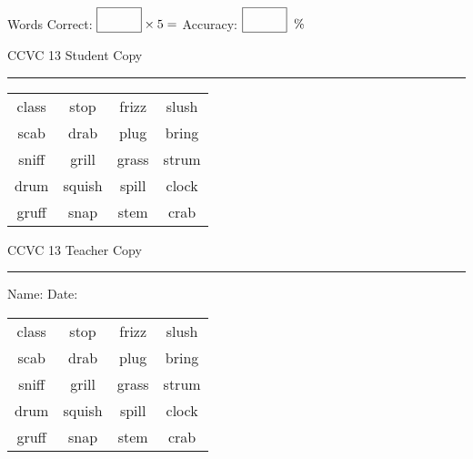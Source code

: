\documentclass{memoir}
\begin{document}
\normalsize

Words Correct: $\fbox{\phantom{\huge 100}} \times 5 = $ Accuracy: $\fbox{\phantom{\huge 100}}\;\; \%$ 

\vfill

\newpage


\footnotesize \noindent
CCVC 13 \hfill Student Copy
\smallskip
\hrule

\Large

\setlength{\tabcolsep}{14pt}
\def\arraystretch{3}

{\selectfont


\begin{vplace}[0.5]
\begin{center}
\begin{tabular}{cccc}
class             & stop & frizz & slush \\
scab & drab             & plug & bring      \\
sniff & grill            & grass                    & strum \\
drum & squish & spill & clock \\
gruff & snap & stem & crab        \\
\end{tabular}
\end{center}
\end{vplace}

}

\newpage

\footnotesize \noindent
CCVC 13 \hfill Teacher Copy
\smallskip
\hrule

\normalsize

\vfill

\noindent
Name: \underline{\hspace{1.75in}} \hfill Date: \underline{\hspace{1in}}

\Large

{\selectfont


\begin{vplace}[0.5]
\begin{center}
\begin{tabular}{cccc}
class             & stop & frizz & slush \\
scab & drab             & plug & bring      \\
sniff & grill            & grass                    & strum \\
drum & squish & spill & clock \\
gruff & snap & stem & crab        \\
\end{tabular}
\end{center}
\end{vplace}



}
\end{document}
